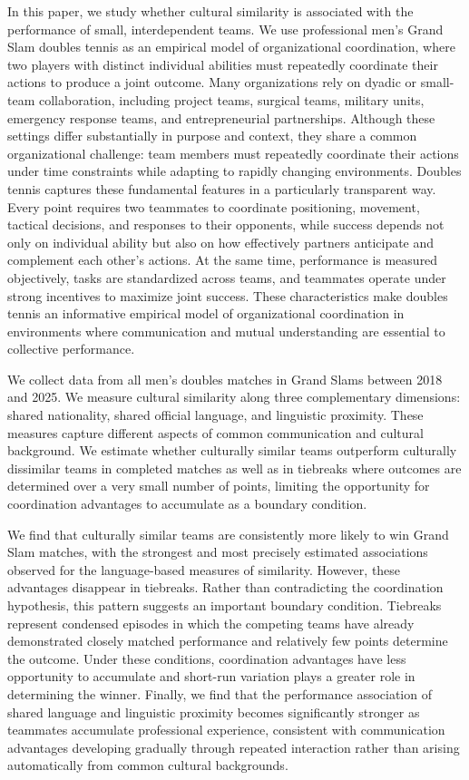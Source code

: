 \documentclass[10pt]{article}
\begin{document}
In this paper, we study whether cultural similarity is associated with the performance of small, interdependent teams. We use professional men's Grand Slam doubles tennis as an empirical model of organizational coordination, where two players with distinct individual abilities must repeatedly coordinate their actions to produce a joint outcome.  Many organizations rely on dyadic or small-team collaboration, including project teams, surgical teams, military units, emergency response teams, and entrepreneurial partnerships. Although these settings differ substantially in purpose and context, they share a common organizational challenge: team members must repeatedly coordinate their actions under time constraints while adapting to rapidly changing environments. Doubles tennis captures these fundamental features in a particularly transparent way. Every point requires two teammates to coordinate positioning, movement, tactical decisions, and responses to their opponents, while success depends not only on individual ability but also on how effectively partners anticipate and complement each other's actions. At the same time, performance is measured objectively, tasks are standardized across teams, and teammates operate under strong incentives to maximize joint success. These characteristics make doubles tennis an informative empirical model of organizational coordination in environments where communication and mutual understanding are essential to collective performance.

 We collect data from all men's  doubles matches in Grand Slams between 2018 and 2025. We measure cultural similarity along three complementary dimensions: shared nationality, shared official language, and linguistic proximity. These measures capture different aspects of common communication and cultural background. We estimate whether culturally similar teams outperform culturally dissimilar teams in completed matches as well as in tiebreaks where outcomes are determined over a very small number of points, limiting the opportunity for coordination advantages to accumulate  as a boundary condition. 

 We find that culturally similar teams are consistently more likely to win Grand Slam matches, with the strongest and most precisely estimated associations observed for the language-based measures of similarity. However, these advantages disappear in tiebreaks. Rather than contradicting the coordination hypothesis, this pattern suggests an important boundary condition. Tiebreaks represent condensed episodes in which the competing teams have already demonstrated closely matched performance and relatively few points determine the outcome. Under these conditions, coordination advantages have less opportunity to accumulate and short-run variation plays a greater role in determining the winner. Finally, we find that the performance association of shared language and linguistic proximity becomes significantly stronger as teammates accumulate professional experience, consistent with communication advantages developing gradually through repeated interaction rather than arising automatically from common cultural backgrounds.
\end{document}
